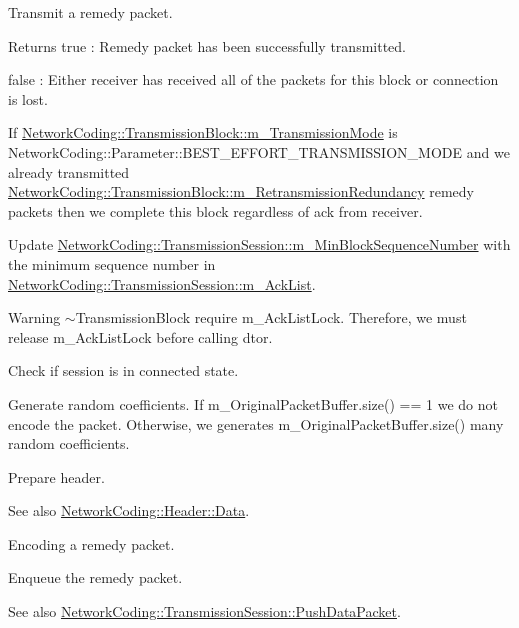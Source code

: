 Transmit a remedy packet. 

\begin{DoxyReturn}{Returns}
true \+: Remedy packet has been successfully transmitted. 

false \+: Either receiver has received all of the packets for this block or connection is lost. 
\end{DoxyReturn}

\begin{DoxyEnumerate}
\item If \hyperlink{class_network_coding_1_1_transmission_block_a82c18d348f0a5660240e47ee9c9880b1}{Network\+Coding\+::\+Transmission\+Block\+::m\+\_\+\+Transmission\+Mode} is Network\+Coding\+::\+Parameter\+::\+B\+E\+S\+T\+\_\+\+E\+F\+F\+O\+R\+T\+\_\+\+T\+R\+A\+N\+S\+M\+I\+S\+S\+I\+O\+N\+\_\+\+M\+O\+DE and we already transmitted \hyperlink{class_network_coding_1_1_transmission_block_a1dc8966af67de1e8309b62e3f87854f2}{Network\+Coding\+::\+Transmission\+Block\+::m\+\_\+\+Retransmission\+Redundancy} remedy packets then we complete this block regardless of ack from receiver.
\item Update \hyperlink{class_network_coding_1_1_transmission_session_a3c5449f03555c74ccff2e4d0b99c13d9}{Network\+Coding\+::\+Transmission\+Session\+::m\+\_\+\+Min\+Block\+Sequence\+Number} with the minimum sequence number in \hyperlink{class_network_coding_1_1_transmission_session_aa7b466f696587e66d2a961701d552a6a}{Network\+Coding\+::\+Transmission\+Session\+::m\+\_\+\+Ack\+List}. \begin{DoxyWarning}{Warning}
$\sim$\+Transmission\+Block require m\+\_\+\+Ack\+List\+Lock. Therefore, we must release m\+\_\+\+Ack\+List\+Lock before calling dtor.
\end{DoxyWarning}

\item Check if session is in connected state.
\item Generate random coefficients. If m\+\_\+\+Original\+Packet\+Buffer.\+size() == 1 we do not encode the packet. Otherwise, we generates m\+\_\+\+Original\+Packet\+Buffer.\+size() many random coefficients.
\item Prepare header. \begin{DoxySeeAlso}{See also}
\hyperlink{struct_network_coding_1_1_header_1_1_data}{Network\+Coding\+::\+Header\+::\+Data}.
\end{DoxySeeAlso}

\item Encoding a remedy packet.
\item Enqueue the remedy packet. \begin{DoxySeeAlso}{See also}
\hyperlink{class_network_coding_1_1_transmission_session_ae248b2c48a54243ce1e47837337231df}{Network\+Coding\+::\+Transmission\+Session\+::\+Push\+Data\+Packet}.
\end{DoxySeeAlso}

\end{DoxyEnumerate}
